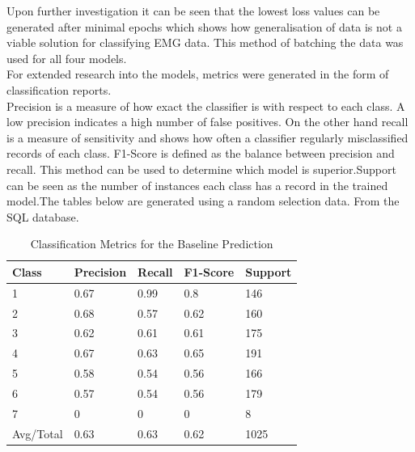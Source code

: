 \documentclass[11pt]{article}
\begin{document}
	\noindent
	Upon further investigation it can be seen that the lowest loss values can be generated after minimal epochs which shows how generalisation of data is not a viable solution for classifying EMG data. This method of batching the data was used for all four models.\\
	
	\noindent
	For extended research into the models, metrics were generated in the form of classification reports.\\
	
	\noindent
	Precision is a measure of how exact the classifier is with respect to each class. A low precision indicates a high number of false positives. On the other hand recall is a measure of sensitivity and shows how often a classifier regularly misclassified records of each class. F1-Score is defined as the balance between precision and recall. This method can be used to determine which model is superior.Support can be seen as the number of instances each class has a record in the trained model.The tables below are generated using a random selection data. From the SQL database.
	
	\begin{table}[H]
		\centering
		\caption{Classification Metrics for the Baseline Prediction}
		\begin{tabular}{l|llll}
			Class     & Precision & Recall & F1-Score & Support \\\hline
			1         & 0.67      & 0.99   & 0.8      & 146     \\
			2         & 0.68      & 0.57   & 0.62     & 160     \\
			3         & 0.62      & 0.61   & 0.61     & 175     \\
			4         & 0.67      & 0.63   & 0.65     & 191     \\
			5         & 0.58      & 0.54   & 0.56     & 166     \\
			6         & 0.57      & 0.54   & 0.56     & 179     \\
			7         & 0         & 0      & 0        & 8       \\
			Avg/Total & 0.63      & 0.63   & 0.62     & 1025   \\\hline\hline
		\end{tabular}
	\end{table}
	
\end{document}
